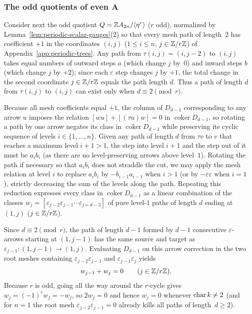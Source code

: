 \subsubsection{The odd quotients of even A}

Consider next the odd quotient $Q=\mathbb Z A_{2n}/\langle\eta^r\rangle$ ($r$ odd), normalized by Lemma~\ref{lem:periodic-scalar-gauges}(2) so that every mesh path of length~$2$ has coefficient $+1$ in the coordinates $(i,j)$ ($1\leq i\leq n$, $j\in\mathbb Z/r\mathbb Z$) of Appendix~\ref{app:periodic-trees}. Any path from $\tau(i,j)=(i,j-2)$ to $(i,j)$ takes equal numbers of outward steps $a$ (which change $j$ by~$0$) and inward steps $b$ (which change $j$ by $+2$); since each $\varepsilon$ step changes $j$ by $+1$, the total change in the second coordinate $j\in\mathbb Z/r\mathbb Z$ equals the path length $d$. Thus a path of length $d$ from $\tau(i,j)$ to $(i,j)$ can exist only when $d\equiv2\pmod r$.

Because all mesh coefficients equal $+1$, the column of $D_{d-1}$ corresponding to any arrow $u$ imposes the relation $[wu]+[(\tau u)w]=0$ in $\operatorname{coker}D_{d-1}$, so rotating a path by one arrow negates its class in $\operatorname{coker}D_{d-1}$ while preserving its cyclic sequence of levels $i\in\{1,\ldots,n\}$. Given any path of length $d$ from $\tau v$ to $v$ that reaches a maximum level $i+1>1$, the step into level $i+1$ and the step out of it must be $a_i b_i$ (as there are no level-preserving arrows above level~$1$). Rotating the path if necessary so that $a_i b_i$ does not straddle the cut, we may apply the mesh relation at level $i$ to replace $a_i b_i$ by $-b_{i-1}a_{i-1}$ when $i>1$ (or by $-\varepsilon\varepsilon$ when $i=1$), strictly decreasing the sum of the levels along the path. Repeating this reduction expresses every class in $\operatorname{coker}D_{d-1}$ as a linear combination of the classes $w_j=[\varepsilon_{j-2}\varepsilon_{j-1}\cdots\varepsilon_{j+d-3}]$ of pure level-$1$ paths of length $d$ ending at $(1,j)$ ($j\in\mathbb Z/r\mathbb Z$).

Since $d\equiv2\pmod r$, the path of length $d-1$ formed by $d-1$ consecutive $\varepsilon$-arrows starting at $(1,j-1)$ has the same source and target as $\varepsilon_{j-1}\colon(1,j-1)\to(1,j)$. Evaluating $D_{d-1}$ on this arrow correction in the two root meshes containing $\varepsilon_{j-2}\varepsilon_{j-1}$ and $\varepsilon_{j-1}\varepsilon_j$ yields
\[
  w_{j-1}+w_j=0\qquad(j\in\mathbb Z/r\mathbb Z).
\]
Because $r$ is odd, going all the way around the $r$-cycle gives $w_j=(-1)^r w_j=-w_j$, so $2w_j=0$ and hence $w_j=0$ whenever $\operatorname{char} k\ne2$ (and for $n=1$ the root mesh $\varepsilon_{j-2}\varepsilon_{j-1}=0$ already kills all paths of length~$d\geq2$).

